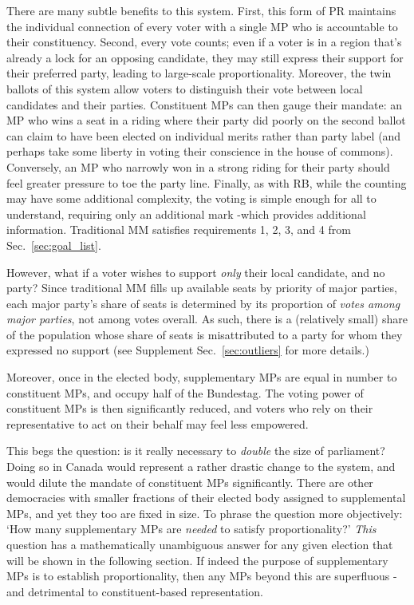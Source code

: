 \documentclass[DIV=calc, paper=a4, fontsize=11pt, twocolumn]{scrartcl}	 %
\begin{document}
There are many subtle benefits to this system. 
First, this form of PR maintains the individual connection of every voter with a single MP who is accountable to their constituency.
Second, every vote counts; even if a voter is in a region that's already a lock for an opposing candidate, they may still express their support for their preferred party, leading to large-scale proportionality.
Moreover, the twin ballots of this system allow voters to distinguish their vote between local candidates and their parties.  Constituent MPs can then gauge their mandate: an MP who wins a seat in a riding where their party did poorly on the second ballot can claim to have been elected on individual merits rather than party label (and perhaps take some liberty in voting their conscience in the house of commons). Conversely, an MP who narrowly won in a strong riding for their party should feel greater pressure to toe the party line.
Finally, as with RB, while the counting may have some additional complexity, the voting is simple enough for all to understand, requiring only an additional mark \--which provides additional information. Traditional MM satisfies requirements 1, 2, 3, and 4 from Sec.~\ref{sec:goal_list}.

However, what if a voter wishes to support \emph{only} their local candidate, and no party? Since traditional MM fills up available seats by priority of major parties, each major party's share of seats is determined by its proportion of \emph{votes among major parties}, not among votes overall. As such, there is a (relatively small) share of the population whose share of seats is misattributed to a party for whom they expressed no support (see Supplement Sec.~\ref{sec:outliers} for more details.)

Moreover, once in the elected body, supplementary MPs are equal in number to constituent MPs, and occupy half of the Bundestag. 
The voting power of constituent MPs is then significantly reduced, and voters who rely on their representative to act on their behalf may feel less empowered.

This begs the question: is it really necessary to \emph{double} the size of parliament? Doing so in Canada would represent a rather drastic change to the system, and would dilute the mandate of constituent MPs significantly. 
There are other democracies with smaller fractions of their elected body assigned to supplemental MPs, and yet they too are fixed in size.
To phrase the question more objectively: `How many supplementary MPs are \emph{needed} to satisfy proportionality?' 
\emph{This} question has a mathematically unambiguous answer for any given election that will be shown in the following section. 
If indeed the purpose of supplementary MPs is to establish proportionality, then any MPs beyond this are superfluous \--and detrimental to constituent-based representation.
\end{document}
